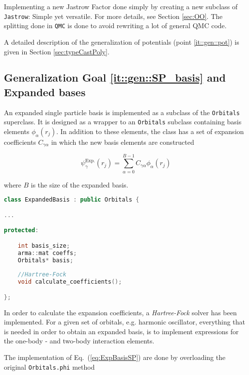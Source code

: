 Implementing a new Jastrow Factor done simply by creating a new subclass of \verb+Jastrow+: Simple yet versatile. For more details, see Section \ref{sec:OO}. The splitting done in \verb+QMC+ is done to avoid rewriting a lot of general QMC code.

A detailed description of the generalization of potentials (point \ref{it::gen::pot}) is given in Section \ref{sec:typeCastPoly}.

\subsection{Generalization Goal \ref{it::gen::SP_basis} and Expanded bases}

An expanded single particle basis is implemented as a subclass of the \verb+Orbitals+ superclass. It is designed as a wrapper to an \verb+Orbitals+ subclass containing basis elements $\phi_\alpha(r_j)$. In addition to these elements, the class has a set of expansion coefficients $C_{\gamma\alpha}$ in which the new basis elements are constructed

\begin{equation}
\label{eq:ExpBasisSP}
 \psi_\gamma^\mathrm{Exp.}(r_j) = \sum_{\alpha=0}^{B - 1} C_{\gamma\alpha}\phi_\alpha(r_j) 
\end{equation}

where $B$ is the size of the expanded basis.

\vspace{0.5cm}
\begin{lstlisting}[language=C++]
class ExpandedBasis : public Orbitals {

...

protected:

    int basis_size;
    arma::mat coeffs;
    Orbitals* basis;
    
    //Hartree-Fock
    void calculate_coefficients();

};

\end{lstlisting}

In order to calculate the expansion coefficients, a \textit{Hartree-Fock} solver has been implemented. For a given set of orbitals, e.g. harmonic oscillator, everything that is needed in order to obtain an expanded basis, is to implement expressions for the one-body - and two-body interaction elements.

The implementation of Eq.~(\ref{eq:ExpBasisSP}) are done by overloading the original \verb+Orbitals.phi+ method

